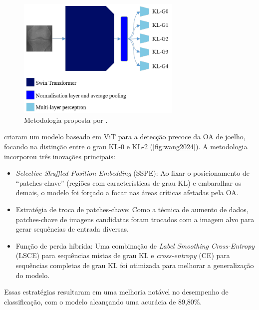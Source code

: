 \begin{figure}[!htbp]
    \centering
    \includegraphics[width=0.7\textwidth]{figs/sekhri2023.png}
    \caption{Metodologia proposta por .}
    \label{fig:sekhri2023}
\end{figure}

 criaram um modelo baseado em ViT para a detecção precoce da OA de joelho, focando na distinção entre o grau KL-0 e KL-2 (\autoref{fig:wang2024}). A metodologia incorporou três inovações principais:

\begin{itemize}
    \item \textit{Selective Shuffled Position Embedding} (SSPE): Ao fixar o posicionamento de ``patches-chave'' (regiões com características de grau KL) e embaralhar os demais, o modelo foi forçado a focar nas áreas críticas afetadas pela OA.
    \item Estratégia de troca de patches-chave: Como a técnica de aumento de dados, patches-chave de imagens candidatas foram trocados com a imagem alvo para gerar sequências de entrada diversas.
    \item Função de perda híbrida: Uma combinação de \textit{Label Smoothing Cross-Entropy} (LSCE) para sequências mistas de grau KL e \textit{cross-entropy} (CE) para sequências completas de grau KL foi otimizada para melhorar a generalização do modelo.
\end{itemize}

Essas estratégias resultaram em uma melhoria notável no desempenho de classificação, com o modelo alcançando uma acurácia de 89,80\%.


